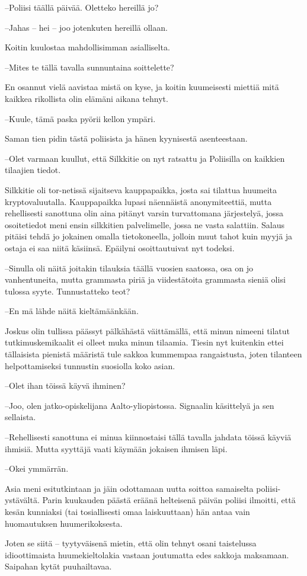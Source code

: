 \documentclass{tsnovel}
\begin{document}
–Poliisi täällä päivää. Oletteko hereillä jo?

–Jahas – hei – joo jotenkuten hereillä ollaan.

Koitin kuulostaa mahdollisimman asialliselta.

–Mites te tällä tavalla sunnuntaina soittelette?

En osannut vielä aavistaa mistä on kyse, ja koitin kuumeisesti miettiä mitä kaikkea rikollista olin elämäni aikana tehnyt.

–Kuule, tämä paska pyörii kellon ympäri.

Saman tien pidin tästä poliisista ja hänen kyynisestä asenteestaan.

–Olet varmaan kuullut, että Silkkitie on nyt ratsattu ja Poliisilla on kaikkien tilaajien tiedot.

Silkkitie oli tor-netissä sijaitseva kauppapaikka, josta sai tilattua huumeita kryptovaluutalla. Kauppapaikka lupasi näennäistä anonymiteettiä, mutta rehellisesti sanottuna olin aina pitänyt varsin turvattomana järjestelyä, jossa osoitetiedot meni ensin silkkitien palvelimelle, jossa ne vasta salattiin. Salaus pitäisi tehdä jo jokainen omalla tietokoneella, jolloin muut tahot kuin myyjä ja ostaja  ei saa niitä käsiinsä. Epäilyni osoittautuivat nyt todeksi.

–Sinulla oli näitä joitakin tilauksia täällä vuosien saatossa, osa on jo vanhentuneita, mutta grammasta piriä ja viidestätoita grammasta sieniä olisi tulossa syyte. Tunnustatteko teot?

–En mä lähde näitä kieltämäänkään.

Joskus olin tullissa päässyt pälkähästä väittämällä, että minun nimeeni tilatut tutkimuskemikaalit ei olleet muka minun tilaamia. Tiesin nyt kuitenkin ettei tällaisista pienistä määristä tule sakkoa kummempaa rangaistusta, joten tilanteen helpottamiseksi tunnustin suosiolla koko asian.

–Olet ihan töissä käyvä ihminen?

–Joo, olen jatko-opiskelijana Aalto-yliopistossa. Signaalin käsittelyä ja sen sellaista.

–Rehellisesti sanottuna ei minua kiinnostaisi tällä tavalla jahdata töissä käyviä ihmisiä. Mutta syyttäjä vaati käymään jokaisen ihmisen läpi.

–Okei ymmärrän.

Asia meni esitutkintaan ja jäin odottamaan uutta soittoa samaiselta poliisi-ystävältä. Parin kuukauden päästä eräänä helteisenä päivän poliisi ilmoitti, että kesän kunniaksi (tai tosiallisesti omaa laiskuuttaan) hän antaa vain huomautuksen huumerikoksesta.

Joten se siitä – tyytyväisenä mietin, että olin tehnyt osani taistelussa idioottimaista huumekieltolakia vastaan joutumatta edes sakkoja maksamaan. Saipahan kytät puuhailtavaa.


\section{}
\end{document}
